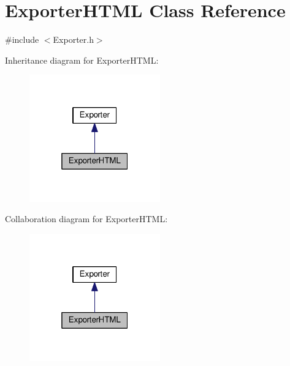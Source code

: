 \hypertarget{class_exporter_h_t_m_l}{}\section{Exporter\+H\+T\+ML Class Reference}
\label{class_exporter_h_t_m_l}


{\ttfamily \#include $<$Exporter.\+h$>$}



Inheritance diagram for Exporter\+H\+T\+ML\+:
\nopagebreak
\begin{figure}[H]
\begin{center}
\leavevmode
\includegraphics[width=160pt]{class_exporter_h_t_m_l__inherit__graph}
\end{center}
\end{figure}


Collaboration diagram for Exporter\+H\+T\+ML\+:
\nopagebreak
\begin{figure}[H]
\begin{center}
\leavevmode
\includegraphics[width=160pt]{class_exporter_h_t_m_l__coll__graph}
\end{center}
\end{figure}

